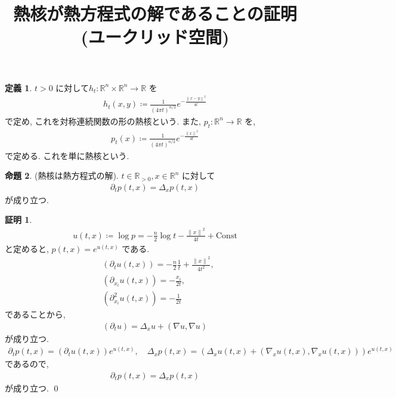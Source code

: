 \documentclass[10pt, fleqn, label-section=none]{bxjsarticle}
\title{熱核が熱方程式の解であることの証明(ユークリッド空間)}
\date{}
\author{}
\theoremstyle{definition}
\newtheorem{dfn}{定義}[section]
\newtheorem{prop}[dfn]{命題}
\newtheorem*{pf*}{証明}
\newcommand{\norm}[1]{\left\|#1\right\|}
\newcommand{\Const}{\textrm{Const}}
\renewcommand{\;}{\, ; \,}
\begin{document}
\maketitle

\section{}


\begin{dfn}$t > 0$ に対して$h_t: \mathbb R^n  \times \mathbb R^n \rightarrow \mathbb R$ を
\begin{align*} h_t(x, y) \coloneqq \frac{1}{(4 \pi t) ^{n/2}} e^{-\frac{\norm{x -y}^2}{4t}} \end{align*}
で定め, これを対称連続関数の形の熱核という. また, $p_t : \mathbb R^n   \rightarrow \mathbb R$ を, 
\begin{align*} p_t(x) \coloneqq \frac{1}{(4 \pi t) ^{n/2}} e^{-\frac{\norm{x}^2}{4t}} \end{align*}
で定める. これを単に熱核という. 
\end{dfn}

\begin{prop}(熱核は熱方程式の解). $t \in \mathbb R_{> 0}, x \in \mathbb R^n$ に対して
\begin{align*} \partial _t p (t, x) = \Delta_x  p (t, x)  \end{align*}
が成り立つ. 
\end{prop}
\begin{pf*}
\begin{align*} u(t, x) \coloneqq \log p = - \frac{n}{2} \log t - \frac{\norm x ^2}{ 4 t} + \Const  \end{align*}
と定めると, $p(t, x) =  e^{u(t,x)} $ である. 
\begin{align*} & (\partial_t u(t, x))  =  - \frac{n}{2} \frac{1}{t} + \frac{\norm x ^2 }{4t^2} , \\& (\partial_{x_i} u(t, x)) =  -\frac{x_i}{ 2 t }  , \\& (\partial_{x_i} ^2  u(t, x)) = -\frac{1}{ 2 t } \end{align*}
であることから, 
\begin{align*}  (\partial_t u)  = \Delta_x u +  (\nabla u, \nabla u) \end{align*} 
が成り立つ. 
\begin{align*} \partial _t p (t, x) = (\partial_t u(t, x)) e^{u(t,x)} , \quad  \Delta_x  p (t, x) = ( \Delta_x u(t, x) + (\nabla_x u (t, x), \nabla_x u (t, x)) ) e^{u(t,x)}  \end{align*}
であるので, 
\begin{align*} \partial _t p (t, x) = \Delta_x  p (t, x)  \end{align*}
が成り立つ. 
\qed
\end{pf*}
\end{document}
